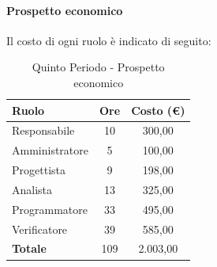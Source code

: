 \documentclass[../PianoDiProgetto.tex]{subfiles}
\begin{document}
			\newpage
			\paragraph{Prospetto economico}
			Il costo di ogni ruolo è indicato di seguito:
			\begin{table}[h]
				\centering
				\begin{tabular}{l * {2}{c}}
				\toprule
				\textbf{Ruolo} & \textbf{Ore} & \textbf{Costo (\euro{})} \\
				\midrule
				Responsabile & 10 & 300,00 \\
				Amministratore & 5 & 100,00 \\
				Progettista & 9 & 198,00 \\
				Analista & 13 & 325,00 \\		
				Programmatore & 33 & 495,00 \\		
				Verificatore & 39 & 585,00 \\				
				\midrule		
				\textbf{Totale} & 109 & 2.003,00 \\
				\bottomrule	
				\end{tabular}
				\caption{Quinto Periodo - Prospetto economico}		
			\end{table}
			
\end{document}
